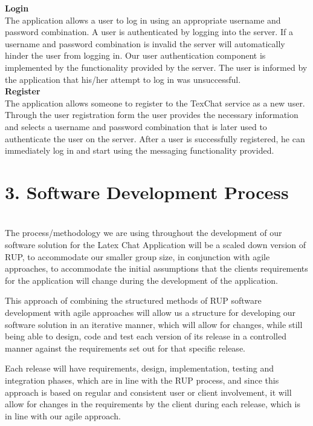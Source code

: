 \documentclass[29pt,a4paper]{moderncv}
\begin{document}
		\noindent\textbf{Login}
		\\The application allows a user to log in using an appropriate username and password combination. A user is authenticated by logging into the server.  If a username and password combination is invalid the server will automatically hinder the user from logging in. Our user authentication component is implemented by the functionality provided by the server. The user is informed by the application that his/her attempt to log in was unsuccessful.\\
		
		\noindent\textbf{Register}
		\\The application allows someone to register to the TexChat service as a new user. Through the user registration form the user provides the necessary information and selects a username and password combination that is later used to authenticate the user on the server. After a user is successfully registered, he can immediately log in and start using the messaging functionality provided.
		
	\vspace{5mm}
		
\newpage
	\section*{3. Software Development Process}
	\vspace{4mm}
	\\The process/methodology we are using throughout the development of our software solution for the Latex Chat Application will be a scaled down version of RUP, to accommodate our smaller group size, in conjunction with agile approaches, to accommodate the initial assumptions that the clients requirements for the application will change during the development of the application.
	
	This approach of combining the structured methods of RUP software development with agile approaches will allow us a structure for developing our software solution in an iterative manner, which will allow for changes, while still being able to design, code and test each version of its release in a controlled manner against the requirements set out for that specific release.
	
	Each release will have requirements, design, implementation, testing and integration phases, which are in line with the RUP process, and since this approach is based on regular and consistent user or client involvement, it will allow for changes in the requirements by the client during each release, which is in line with our agile approach.
	
\end{document}
